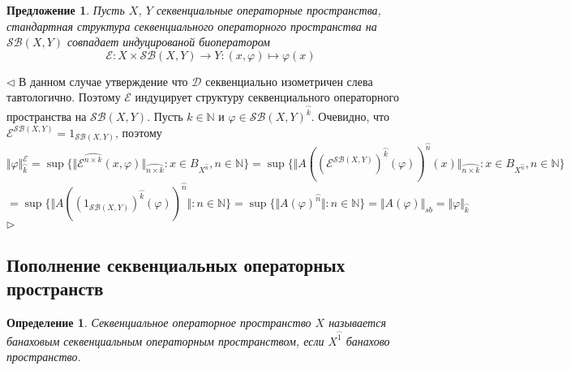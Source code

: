 \documentclass[12pt]{article}
\newtheorem{proposition}[theorem]{Предложение}
\newtheorem{definition}[theorem]{Определение}
\newenvironment{proof}{\par $\triangleleft$}{$\triangleright$}
\begin{document}
\begin{proposition}\label{PrSQOpSqQuanIsEquivToStandard}
Пусть $X$, $Y$ секвенциальные операторные пространства, стандартная структура секвенциального операторного пространства на $\mathcal{SB}(X,Y)$ совпадает индуцированой биоператором
$$
\mathcal{E}:X\times\mathcal{SB}(X,Y)\to Y:(x,\varphi)\mapsto\varphi(x)
$$
\end{proposition}
\begin{proof}
В данном случае утверждение что $\mathcal{D}$ секвенциально изометричен слева тавтологично. Поэтому $\mathcal{E}$ индуцирует структуру секвенциального операторного пространства на $\mathcal{SB}(X,Y)$. Пусть $k\in\mathbb{N}$ и $\varphi\in\mathcal{SB}(X,Y)^{\wideparen{k}}$. 
Очевидно, что $\mathcal{\mathcal{E}}^{\mathcal{SB}(X,Y)}=1_{\mathcal{SB}(X,Y)}$, поэтому
$$
\Vert\varphi\Vert_{\wideparen{k}}^{\mathcal{E}}
=\sup\{\Vert\mathcal{E}^{\wideparen{n\times k}}(x,\varphi)\Vert_{\wideparen{n\times k}}:x\in B_{X^{\wideparen{n}}}, n\in\mathbb{N}\}
=\sup\{\Vert A((\mathcal{E}^{\mathcal{SB}(X,Y)})^{\wideparen{k}}(\varphi))^{\wideparen{n}}(x)\Vert_{\wideparen{n\times k}}:x\in B_{X^{\wideparen{n}}}, n\in\mathbb{N}\}
$$
$$
=\sup\{\Vert A((1_{\mathcal{SB}(X,Y)})^{\wideparen{k}}(\varphi))^{\wideparen{n}}\Vert: n\in\mathbb{N}\}
=\sup\{\Vert A(\varphi)^{\wideparen{n}}\Vert: n\in\mathbb{N}\}
=\Vert A(\varphi)\Vert_{sb}=\Vert\varphi\Vert_{\wideparen{k}}
$$
\end{proof}

























\subsection{Пополнение секвенциальных операторных пространств}

\begin{definition}\label{DefSQBanSpace}
Секвенциальное операторное пространство $X$ называется \textit{банаховым секвенциальным операторным пространством}, если $X^{\wideparen{1}}$ банахово пространство.
\end{definition}
\end{document}

